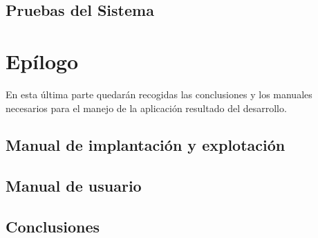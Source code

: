 \documentclass[a4paper,11pt]{book}
\begin{document}
\chapter{Pruebas del Sistema}


\part{Epí­logo}
\null\vfill
\noindent En esta última parte quedarán recogidas las conclusiones y los manuales necesarios para el manejo de la aplicación resultado del desarrollo. 
\vfill

\chapter{Manual de implantación y explotación}


\chapter{Manual de usuario}


\chapter{Conclusiones}



\backmatter


\end{document}
